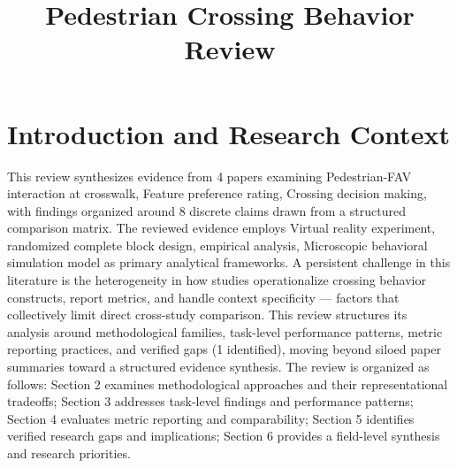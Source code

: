 \documentclass{article}
\title{Pedestrian Crossing Behavior Review}
\begin{document}
\maketitle
\section{Introduction and Research Context}
This review synthesizes evidence from 4 papers examining Pedestrian-FAV interaction at crosswalk, Feature preference rating, Crossing decision making, with findings organized around 8 discrete claims drawn from a structured comparison matrix. The reviewed evidence employs Virtual reality experiment, randomized complete block design, empirical analysis, Microscopic behavioral simulation model as primary analytical frameworks. A persistent challenge in this literature is the heterogeneity in how studies operationalize crossing behavior constructs, report metrics, and handle context specificity — factors that collectively limit direct cross-study comparison. This review structures its analysis around methodological families, task-level performance patterns, metric reporting practices, and verified gaps (1 identified), moving beyond siloed paper summaries toward a structured evidence synthesis. The review is organized as follows: Section 2 examines methodological approaches and their representational tradeoffs; Section 3 addresses task-level findings and performance patterns; Section 4 evaluates metric reporting and comparability; Section 5 identifies verified research gaps and implications; Section 6 provides a field-level synthesis and research priorities.
\end{document}

